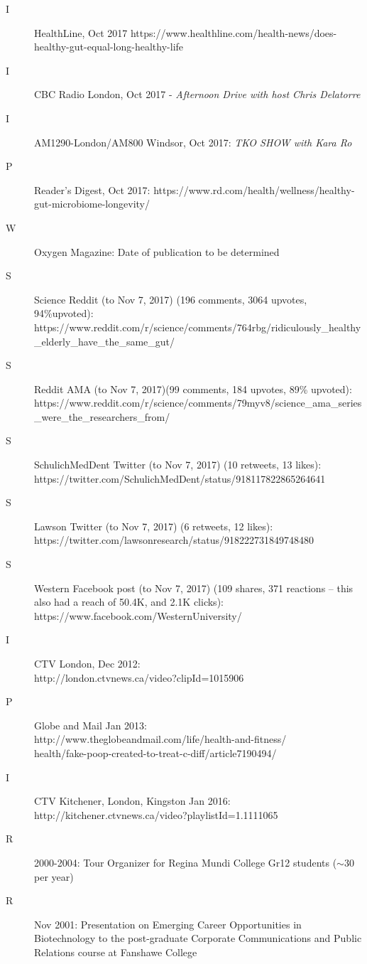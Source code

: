 \documentclass[11pt]{article}
\begin{document}
\begin{description}
\item[I] HealthLine, Oct 2017 https://www.healthline.com/health-news/does-healthy-gut-equal-long-healthy-life
\item[I] CBC Radio London, Oct 2017 -  {\em Afternoon Drive with host Chris Delatorre}
\item[I] AM1290-London/AM800 Windsor, Oct 2017: {\em TKO SHOW with Kara Ro} 
\item[P] Reader’s Digest, Oct 2017: https://www.rd.com/health/wellness/healthy-gut-microbiome-longevity/
\item[W] Oxygen Magazine: Date of publication to be determined
\item[S] Science Reddit (to Nov 7, 2017) (196 comments, 3064 upvotes, 94\%upvoted): \\https://www.reddit.com/r/science/comments/764rbg/ridiculously\_healthy\_elderly\_have\_the\_same\_gut/
\item[S] Reddit AMA (to Nov 7, 2017)(99 comments, 184 upvotes, 89\% upvoted): \\https://www.reddit.com/r/science/comments/79myv8/science\_ama\_series\_were\_the\_researchers\_from/
\item[S] SchulichMedDent Twitter (to Nov 7, 2017) (10 retweets, 13 likes): \\https://twitter.com/SchulichMedDent/status/918117822865264641
\item[S] Lawson Twitter (to Nov 7, 2017) (6 retweets, 12 likes): \\https://twitter.com/lawsonresearch/status/918222731849748480
\item[S] Western Facebook post (to Nov 7, 2017) (109 shares, 371 reactions – this also had a reach of 50.4K, and 2.1K clicks): https://www.facebook.com/WesternUniversity/
\item[I] CTV London, Dec 2012: \\http://london.ctvnews.ca/video?clipId=1015906
\item[P] Globe and Mail Jan 2013: \\http://www.theglobeandmail.com/life/health-and-fitness/\\health/fake-poop-created-to-treat-c-diff/article7190494/
\item[I] CTV Kitchener, London, Kingston Jan 2016:\\http://kitchener.ctvnews.ca/video?playlistId=1.1111065
\item[R] 2000-2004: Tour Organizer for Regina Mundi College Gr12 students ($\sim$30 per year)
\item[R] Nov 2001: Presentation on Emerging Career Opportunities in 	Biotechnology to the  post-graduate Corporate 	Communications and Public Relations course at	Fanshawe College

\end{description}
\end{document}
